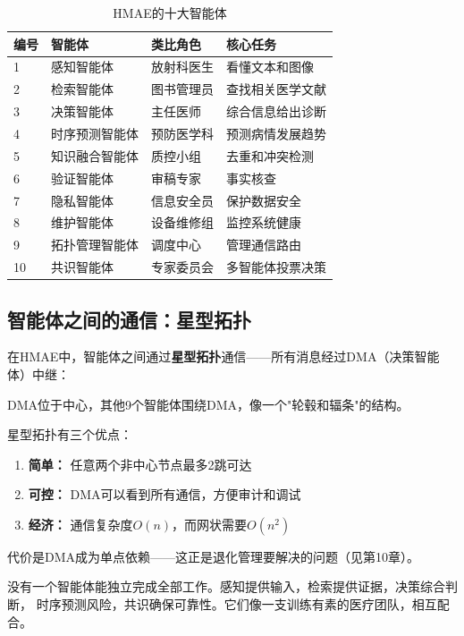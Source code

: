 \documentclass[11pt,a4paper]{ctexart}
\begin{document}
\begin{table}[H]
\centering
\small
\begin{tabular}{llll}
\toprule
\textbf{编号} & \textbf{智能体} & \textbf{类比角色} & \textbf{核心任务} \\
\midrule
1 & 感知智能体 & 放射科医生 & 看懂文本和图像 \\
2 & 检索智能体 & 图书管理员 & 查找相关医学文献 \\
3 & 决策智能体 & 主任医师 & 综合信息给出诊断 \\
4 & 时序预测智能体 & 预防医学科 & 预测病情发展趋势 \\
5 & 知识融合智能体 & 质控小组 & 去重和冲突检测 \\
6 & 验证智能体 & 审稿专家 & 事实核查 \\
7 & 隐私智能体 & 信息安全员 & 保护数据安全 \\
8 & 维护智能体 & 设备维修组 & 监控系统健康 \\
9 & 拓扑管理智能体 & 调度中心 & 管理通信路由 \\
10 & 共识智能体 & 专家委员会 & 多智能体投票决策 \\
\bottomrule
\end{tabular}
\caption{HMAE的十大智能体}
\end{table}

\subsection{智能体之间的通信：星型拓扑}

在HMAE中，智能体之间通过\textbf{星型拓扑}通信——所有消息经过DMA（决策智能体）中继：

\begin{center}
DMA位于中心，其他9个智能体围绕DMA，像一个"轮毂和辐条"的结构。
\end{center}

\begin{keybox}[为什么是星型？]
星型拓扑有三个优点：
\begin{enumerate}[nosep]
\item \textbf{简单：} 任意两个非中心节点最多2跳可达
\item \textbf{可控：} DMA可以看到所有通信，方便审计和调试
\item \textbf{经济：} 通信复杂度$O(n)$，而网状需要$O(n^2)$
\end{enumerate}
代价是DMA成为单点依赖——这正是退化管理要解决的问题（见第10章）。
\end{keybox}

\begin{keybox}
没有一个智能体能独立完成全部工作。感知提供输入，检索提供证据，决策综合判断，
时序预测风险，共识确保可靠性。它们像一支训练有素的医疗团队，相互配合。
\end{keybox}
\end{document}
